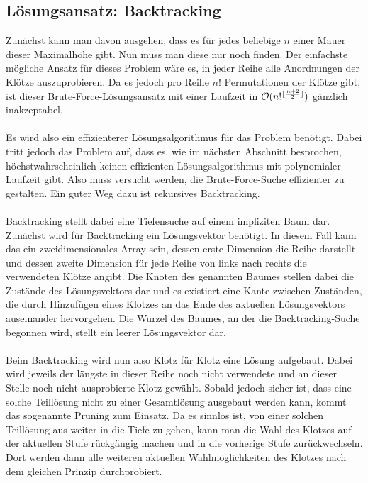 \documentclass[a4paper, notitlepage, 12pt]{scrartcl}
\DeclarePairedDelimiter\floor{\lfloor}{\rfloor}
\begin{document}
\subsection{Lösungsansatz: Backtracking}
Zunächst kann man davon ausgehen, dass es für jedes beliebige $n$ einer Mauer dieser Maximalhöhe gibt. Nun muss man diese nur noch finden. Der einfachste mögliche Ansatz für dieses Problem wäre es, in jeder Reihe alle Anordnungen der Klötze auszuprobieren. Da es jedoch pro Reihe $n!$ Permutationen der Klötze gibt, ist dieser Brute-Force-Lösungsansatz mit einer Laufzeit in $\mathcal{O}(n!^{\floor{\frac{n + 2}{2}}})$ gänzlich inakzeptabel.
\\ \\
Es wird also ein effizienterer Lösungsalgorithmus für das Problem benötigt. Dabei tritt jedoch das Problem auf, dass es, wie im nächsten Abschnitt besprochen, höchstwahrscheinlich keinen effizienten Lösungsalgorithmus mit polynomialer Laufzeit gibt. Also muss versucht werden, die Brute-Force-Suche effizienter zu gestalten. Ein guter Weg dazu ist rekursives Backtracking.
\\ \\
Backtracking stellt dabei eine Tiefensuche auf einem impliziten Baum dar. Zunächst wird für Backtracking ein Lösungsvektor benötigt. In diesem Fall kann das ein zweidimensionales Array sein, dessen erste Dimension die Reihe darstellt und dessen zweite Dimension für jede Reihe von links nach rechts die verwendeten Klötze angibt. Die Knoten des genannten Baumes stellen dabei die Zustände des Lösungsvektors dar und es existiert eine Kante zwischen Zuständen, die durch Hinzufügen eines Klotzes an das Ende des aktuellen Lösungsvektors auseinander hervorgehen. Die Wurzel des Baumes, an der die Backtracking-Suche begonnen wird, stellt ein leerer Lösungsvektor dar.
\\ \\
Beim Backtracking wird nun also Klotz für Klotz eine Lösung aufgebaut. Dabei wird jeweils der längste in dieser Reihe noch nicht verwendete und an dieser Stelle noch nicht ausprobierte Klotz gewählt. Sobald jedoch sicher ist, dass eine solche Teillösung nicht zu einer Gesamtlösung ausgebaut werden kann, kommt das sogenannte Pruning zum Einsatz. Da es sinnlos ist, von einer solchen Teillösung aus weiter in die Tiefe zu gehen, kann man die Wahl des Klotzes auf der aktuellen Stufe rückgängig machen und in die vorherige Stufe zurückwechseln. Dort werden dann alle weiteren aktuellen Wahlmöglichkeiten des Klotzes nach dem gleichen Prinzip durchprobiert.
\\ \\
\end{document}
